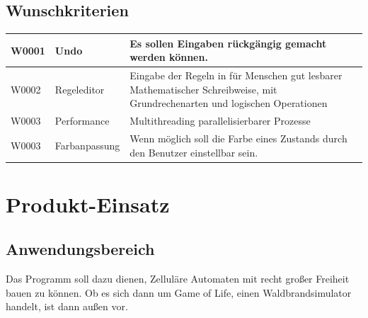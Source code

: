 \documentclass[11pt,a4paper]{article}
\begin{document}

\subsection{Wunschkriterien}
\begin{longtable}[m]{|m{2.2cm}|m{4cm}|m{8cm}|}
\hline
W0001 & Undo & Es sollen Eingaben rückgängig gemacht werden können.\\
\hline
W0002 & Regeleditor & Eingabe der Regeln in für Menschen gut lesbarer Mathematischer Schreibweise, mit Grundrechenarten und logischen Operationen\\
\hline
W0003 & Performance & Multithreading parallelisierbarer Prozesse\\
\hline
W0003 &Farbanpassung & Wenn möglich soll die Farbe eines Zustands durch den Benutzer einstellbar sein.\\
\hline
\end{longtable}


\pagebreak
\section{Produkt-Einsatz}
\subsection{Anwendungsbereich}
Das Programm soll dazu dienen, Zelluläre Automaten mit recht großer Freiheit bauen zu können. Ob es sich dann um Game of Life, einen Waldbrandsimulator handelt, ist dann außen vor.
\end{document}
